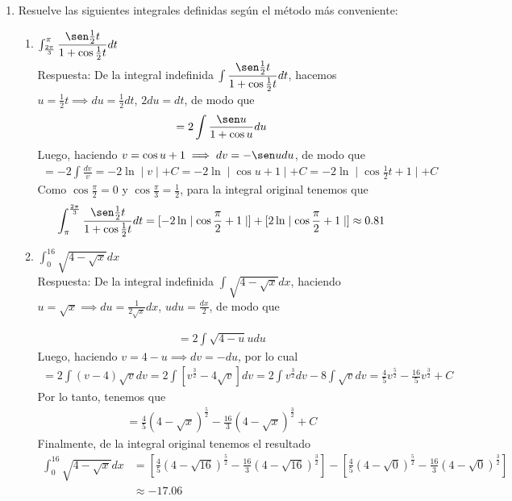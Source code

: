 \documentclass[a4paper,12pt]{report}
\begin{document}
\begin{enumerate}
\begin{enumerate}
	\end{enumerate}
	\item Resuelve las siguientes integrales definidas según el método más conveniente:
	\begin{enumerate}
		\item $\int_{\frac{2\pi}{3}}^{\pi} \dfrac{\sen \frac{1}{2} t}{1 + \cos\frac{1}{2} t} dt$
		\\ \vspace{0.5cm}
		Respuesta: De la integral indefinida $\int \dfrac{\sen \frac{1}{2} t}{1 + \cos\frac{1}{2} t} dt$, hacemos $u = \frac{1}{2} t \implies du=\frac{1}{2}dt$, $2du = dt$, de modo que
		\begin{align*}
			= 2\int \frac{\sen u}{1 + \cos u} du
		\end{align*}
		Luego, haciendo $v = \cos u + 1 \implies dv= -\sen udu$, de modo que
		\begin{align*}
			=-2\int \frac{dv}{v} = -2\ln \mid v \mid +C = -2 \ln \mid \cos u + 1 \mid +C = -2 \ln \mid \cos \frac{1}{2}t + 1 \mid + C
		\end{align*}
		Como $\cos \frac{\pi}{2} = 0$ y $\cos \frac{\pi}{3} = \frac{1}{2}$, para la integral original tenemos que 
		\begin{align*}
			\int_{\pi}^{\frac{2\pi}{3}} \frac{\sen \frac{1}{2} t}{1 + \cos\frac{1}{2} t} dt = [-2\ln \mid \cos \frac{\pi}{2} + 1\mid] + [2\ln \mid \cos \frac{\pi}{2} + 1\mid] \approx 0.81
		\end{align*}
		\item $\int_{0}^{16} \sqrt{4 - \sqrt{x}} dx$
		\\ \vspace{0.5cm}
		Respuesta: De la integral indefinida $\int \sqrt{4 - \sqrt{x}} dx$, haciendo $u = \sqrt{x} \implies du = \frac{1}{2\sqrt{x}}dx$, $udu = \frac{dx}{2}$, de modo que

		\begin{align*}
			= 2\int \sqrt{4 - u}udu
		\end{align*}
		Luego, haciendo $v = 4 -u \implies dv = -du$, por lo cual
		\begin{align*}
			=2\int (v-4) \sqrt{v} dv = 2\int [v^{\frac{3}{2}} - 4\sqrt{v}]dv = 2\int v^{\frac{3}{2}}dv - 8\int \sqrt{v}dv = \frac{4}{5}v^{\frac{5}{2}} - \frac{16}{5}v^{\frac{3}{2}} + C
		\end{align*}
		Por lo tanto, tenemos que
		\begin{align*}
			=\frac{4}{5}(4 - \sqrt{x})^\frac{5}{2} -\frac{16}{3}(4-\sqrt{x})^\frac{3}{2} +C
		\end{align*}
		Finalmente, de la integral original tenemos el resultado 
		\begin{align*}
			\int_{0}^{16} \sqrt{4 - \sqrt{x}} dx &= [\frac{4}{5}(4 - \sqrt{16})^\frac{5}{2} -\frac{16}{3}(4-\sqrt{16})^\frac{3}{2}] - [\frac{4}{5}(4 - \sqrt{0})^\frac{5}{2} -\frac{16}{3}(4-\sqrt{0})^\frac{3}{2}] \\& \approx -17.06
		\end{align*}

	\end{enumerate}

\end{enumerate}
\end{document}
